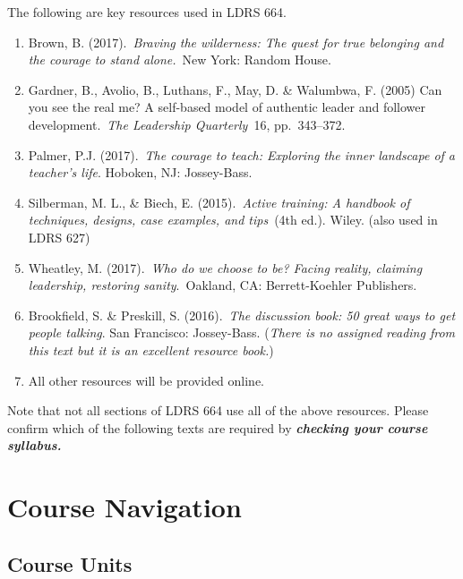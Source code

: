 \documentclass[
]{book}
\begin{document}
The following are key resources used in LDRS 664.

\begin{enumerate}
\def\labelenumi{\arabic{enumi}.}
\item
  Brown, B. (2017).~\emph{Braving the wilderness: The quest for true belonging and the courage to stand alone.}~New York: Random House.
\item
  Gardner, B., Avolio, B., Luthans, F., May, D. \& Walumbwa, F. (2005) Can you see the real me? A self-based model of authentic leader and follower development.~\emph{The Leadership Quarterly}~16, pp.~343--372.
\item
  Palmer, P.J. (2017).~\emph{The courage to teach: Exploring the inner landscape of a teacher's life}. Hoboken, NJ: Jossey-Bass.
\item
  Silberman, M. L., \& Biech, E. (2015).~\emph{Active training: A handbook of techniques, designs, case examples, and tips}~(4th ed.). Wiley. (also used in LDRS 627)
\item
  Wheatley, M. (2017).~\emph{Who do we choose to be? Facing reality, claiming leadership, restoring sanity}.~Oakland, CA: Berrett-Koehler Publishers.
\item
  Brookfield, S. \& Preskill, S. (2016).~\emph{The discussion book: 50 great ways to get people talking}. San Francisco: Jossey-Bass. (\emph{There is no assigned reading from this text but it is an excellent resource book.})
\item
  All other resources will be provided online.
\end{enumerate}

\begin{caution}
Note that not all sections of LDRS 664 use all of the above resources. Please confirm which of the following texts are required by \textbf{\emph{checking your course syllabus.}}
\end{caution}

\hypertarget{course-navigation}{%
\section*{Course Navigation}\label{course-navigation}}

\hypertarget{course-units-1}{%
\subsection*{Course Units}\label{course-units-1}}
\end{document}
